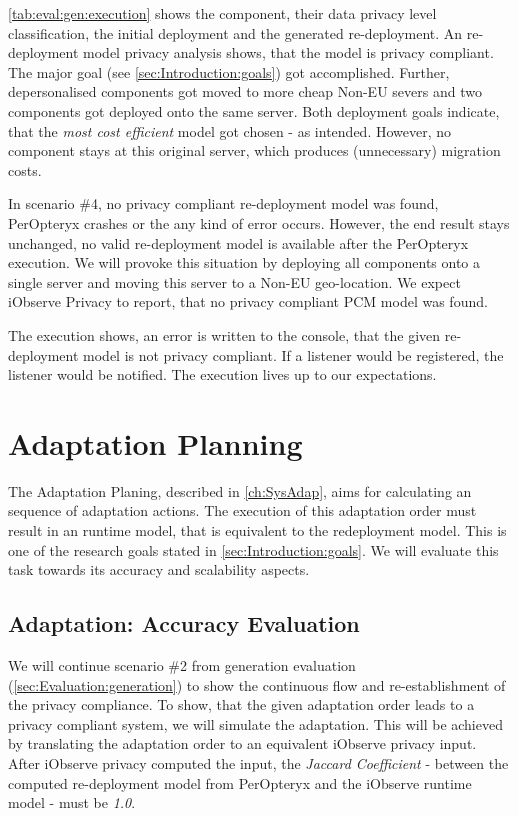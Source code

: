 \autoref{tab:eval:gen:execution} shows the component, their data privacy level classification, the initial deployment and the generated re-deployment. An re-deployment model privacy analysis shows, that the model is privacy compliant. The major goal (see \autoref{sec:Introduction:goals}) got accomplished. Further, depersonalised components got moved to more cheap Non-EU severs and two components got deployed onto the same server. Both deployment goals indicate, that the \textit{most cost efficient} model got chosen - as intended. However, no component stays at this original server, which produces (unnecessary) migration costs.

In scenario \#4, no privacy compliant re-deployment model was found, PerOpteryx crashes or the any kind of error occurs. However, the end result stays unchanged, no valid re-deployment model is available after the PerOpteryx execution. We will provoke this situation by deploying all components onto a single server and moving this server to a Non-EU geo-location. We expect iObserve Privacy to report, that no privacy compliant PCM model was found.

The execution shows, an error is written to the console, that the given re-deployment model is not privacy compliant. If a listener would be registered, the listener would be notified. The execution lives up to our expectations. 

\section{Adaptation Planning}
\label{sec:Evaluation:planning}

The Adaptation Planing, described in \autoref{ch:SysAdap}, aims for calculating an sequence of adaptation actions. The execution of this adaptation order must result in an runtime model, that is equivalent to the redeployment model. This is one of the research goals stated in \autoref{sec:Introduction:goals}. We will evaluate this task towards its accuracy and scalability aspects.

 
\subsection{Adaptation: Accuracy Evaluation}

We will continue scenario \#2 from generation evaluation (\autoref{sec:Evaluation:generation}) to show the continuous flow and re-establishment of the privacy compliance. To show, that the given adaptation order leads to a privacy compliant system, we will simulate the adaptation. This will be achieved by translating the adaptation order to an equivalent iObserve privacy input. After iObserve privacy computed the input, the \textit{Jaccard Coefficient} - between the computed re-deployment model from PerOpteryx and the iObserve runtime model - must be \textit{1.0}.


